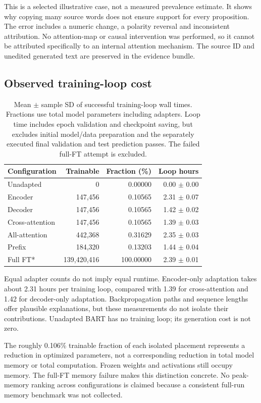 \documentclass[11pt,letterpaper]{article}
\begin{document}
This is a selected illustrative case, not a measured prevalence estimate. It shows why copying many source words does not ensure support for every proposition. The error includes a numeric change, a polarity reversal and inconsistent attribution. No attention-map or causal intervention was performed, so it cannot be attributed specifically to an internal attention mechanism. The source ID and unedited generated text are preserved in the evidence bundle.
\subsection{Observed training-loop cost}
\begin{table}[H]
\centering
\small
\begin{tabular}{lrrr}\toprule Configuration & Trainable & Fraction (\%) & Loop hours\\\midrule
Unadapted & 0 & 0.00000 & 0.00 $\pm$ 0.00\\
Encoder & 147,456 & 0.10565 & 2.31 $\pm$ 0.07\\
Decoder & 147,456 & 0.10565 & 1.42 $\pm$ 0.02\\
Cross-attention & 147,456 & 0.10565 & 1.39 $\pm$ 0.03\\
All-attention & 442,368 & 0.31629 & 2.35 $\pm$ 0.03\\
Prefix & 184,320 & 0.13203 & 1.44 $\pm$ 0.04\\
Full FT* & 139,420,416 & 100.00000 & 2.39 $\pm$ 0.01\\
\bottomrule\end{tabular}
\caption{Mean $\pm$ sample SD of successful training-loop wall times. Fractions use total model parameters including adapters. Loop time includes epoch validation and checkpoint saving, but excludes initial model/data preparation and the separately executed final validation and test prediction passes. The failed full-FT attempt is excluded.}
\end{table}

Equal adapter counts do not imply equal runtime. Encoder-only adaptation takes about 2.31 hours per training loop, compared with 1.39 for cross-attention and 1.42 for decoder-only adaptation. Backpropagation paths and sequence lengths offer plausible explanations, but these measurements do not isolate their contributions. Unadapted BART has no training loop; its generation cost is not zero.

The roughly 0.106\% trainable fraction of each isolated placement represents a reduction in optimized parameters, not a corresponding reduction in total model memory or total computation. Frozen weights and activations still occupy memory. The full-FT memory failure makes this distinction concrete. No peak-memory ranking across configurations is claimed because a consistent full-run memory benchmark was not collected.
\end{document}
